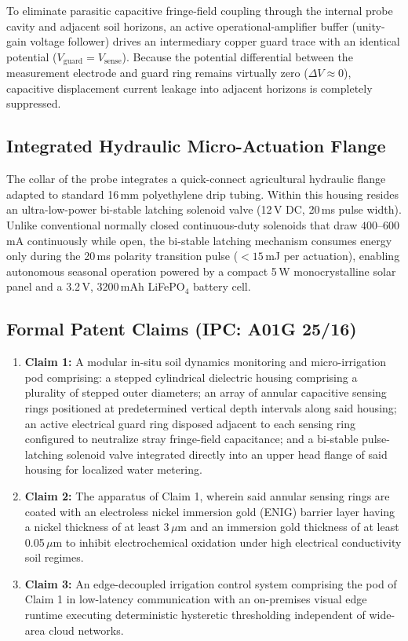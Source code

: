 \documentclass[journal,10pt,twocolumn]{IEEEtran}
\begin{document}
To eliminate parasitic capacitive fringe-field coupling through the internal probe cavity and adjacent soil horizons, an active operational-amplifier buffer (unity-gain voltage follower) drives an intermediary copper guard trace with an identical potential ($V_{\text{guard}} = V_{\text{sense}}$). Because the potential differential between the measurement electrode and guard ring remains virtually zero ($\Delta V \approx 0$), capacitive displacement current leakage into adjacent horizons is completely suppressed.

\subsection{Integrated Hydraulic Micro-Actuation Flange}
The collar of the probe integrates a quick-connect agricultural hydraulic flange adapted to standard 16\,mm polyethylene drip tubing. Within this housing resides an ultra-low-power bi-stable latching solenoid valve (12\,V DC, 20\,ms pulse width). Unlike conventional normally closed continuous-duty solenoids that draw $400$--$600$\,mA continuously while open, the bi-stable latching mechanism consumes energy only during the 20\,ms polarity transition pulse ($<15$\,mJ per actuation), enabling autonomous seasonal operation powered by a compact 5\,W monocrystalline solar panel and a 3.2\,V, 3200\,mAh LiFePO$_4$ battery cell.

\subsection{Formal Patent Claims (IPC: A01G 25/16)}
\begin{enumerate}
    \item \textbf{Claim 1:} A modular in-situ soil dynamics monitoring and micro-irrigation pod comprising: a stepped cylindrical dielectric housing comprising a plurality of stepped outer diameters; an array of annular capacitive sensing rings positioned at predetermined vertical depth intervals along said housing; an active electrical guard ring disposed adjacent to each sensing ring configured to neutralize stray fringe-field capacitance; and a bi-stable pulse-latching solenoid valve integrated directly into an upper head flange of said housing for localized water metering.
    \item \textbf{Claim 2:} The apparatus of Claim 1, wherein said annular sensing rings are coated with an electroless nickel immersion gold (ENIG) barrier layer having a nickel thickness of at least 3\,$\mu$m and an immersion gold thickness of at least 0.05\,$\mu$m to inhibit electrochemical oxidation under high electrical conductivity soil regimes.
    \item \textbf{Claim 3:} An edge-decoupled irrigation control system comprising the pod of Claim 1 in low-latency communication with an on-premises visual edge runtime executing deterministic hysteretic thresholding independent of wide-area cloud networks.
\end{enumerate}
\end{document}
